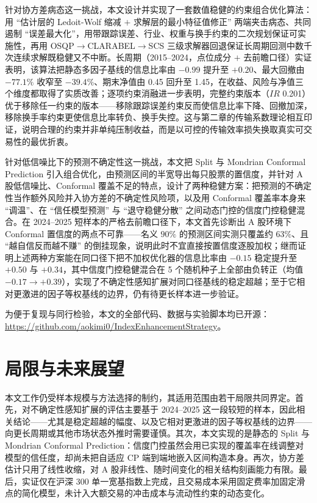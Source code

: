 针对协方差病态这一挑战，本文设计并实现了一套数值稳健的约束组合优化算法：用 ``估计层的 Ledoit-Wolf 缩减 $+$ 求解层的最小特征值修正'' 两端夹击病态、共同遏制 ``误差最大化''，用带跟踪误差、行业、权重与换手约束的二次规划保证可实施性，再用 OSQP$\to$CLARABEL$\to$SCS 三级求解器回退保证长周期回测中数千次连续求解既稳健又不中断。长周期（2015--2024，点位成分 $+$ 去前瞻口径）实证表明，该算法把静态多因子基线的信息比率由 $-0.99$ 提升至 $+0.20$、最大回撤由 $-77.1\%$ 收窄至 $-39.4\%$、期末净值由 0.45 回升至 1.45，在收益、风险与净值三个维度都取得了实质改善；逐项约束消融进一步表明，完整约束版本（$IR$ 0.201）优于移除任一约束的版本——移除跟踪误差约束反而使信息比率下降、回撤加深，移除换手率约束更使信息比率转负、换手失控。这与第二章的传输系数理论相互印证，说明合理的约束并非单纯压制收益，而是以可控的传输效率损失换取真实可交易性的最优折衷。

针对低信噪比下的预测不确定性这一挑战，本文把 Split 与 Mondrian Conformal Prediction 引入组合优化，由预测区间的半宽导出每只股票的置信度，并针对 A 股低信噪比、Conformal 覆盖不足的特点，设计了两种稳健方案：把预测的不确定性当作额外风险并入协方差的不确定性风险项，以及用 Conformal 覆盖率本身来 ``调温''、在 ``信任模型预测'' 与 ``退守稳健分散'' 之间动态门控的信度门控稳健混合。在 2024--2025 短样本的严格去前瞻口径下，本文首先诊断出 A 股环境下 Conformal 置信度的两点不可靠——名义 $90\%$ 的预测区间实测只覆盖约 $63\%$、且 ``越自信反而越不赚'' 的倒挂现象，说明此时不宜直接按置信度逐股加权；继而证明上述两种方案能在同口径下把不加权优化器的信息比率由 $-0.15$ 稳定提升至 $+0.50$ 与 $+0.34$，其中信度门控稳健混合在 5 个随机种子上全部由负转正（均值 $-0.17\to+0.39$），实现了不确定性感知扩展对同口径基线的稳定超越；至于它相对更激进的因子等权基线的边界，仍有待更长样本进一步验证。

为便于复现与同行检验，本文的全部代码、数据与实验脚本均已开源：\url{https://github.com/aokimi0/IndexEnhancementStrategy}。

\section{局限与未来展望}
\label{sec:future_work}
本文工作仍受样本规模与方法选择的制约，其适用范围由若干局限共同界定。首先，对不确定性感知扩展的评估主要基于 2024--2025 这一段较短的样本，因此相关结论——尤其是稳定超越的幅度、以及它相对更激进的因子等权基线的边界——向更长周期或其他市场状态外推时需要谨慎。其次，本文实现的是静态的 Split 与 Mondrian Conformal Prediction：信度门控虽然会用已实现的覆盖率在线调整对模型的信任度，却尚未把自适应 CP 端到端地嵌入区间构造本身。再次，协方差估计只用了线性收缩，对 A 股非线性、随时间变化的相关结构刻画能力有限。最后，实证仅在沪深 300 单一宽基指数上完成，且交易成本采用固定费率加固定滑点的简化模型，未计入大额交易的冲击成本与流动性约束的动态变化。

